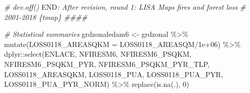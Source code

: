 \documentclass[10pt,landscape,a3paper]{article}
\newenvironment{Shaded}{\begin{snugshade}}{\end{snugshade}}
\newcommand{\AttributeTok}[1]{\textcolor[rgb]{0.77,0.63,0.00}{#1}}
\newcommand{\CommentTok}[1]{\textcolor[rgb]{0.56,0.35,0.01}{\textit{#1}}}
\newcommand{\DecValTok}[1]{\textcolor[rgb]{0.00,0.00,0.81}{#1}}
\newcommand{\FloatTok}[1]{\textcolor[rgb]{0.00,0.00,0.81}{#1}}
\newcommand{\FunctionTok}[1]{\textcolor[rgb]{0.00,0.00,0.00}{#1}}
\newcommand{\NormalTok}[1]{#1}
\newcommand{\OtherTok}[1]{\textcolor[rgb]{0.56,0.35,0.01}{#1}}
\newcommand{\RegionMarkerTok}[1]{#1}
\newcommand{\SpecialCharTok}[1]{\textcolor[rgb]{0.00,0.00,0.00}{#1}}
\begin{document}
\begin{Shaded}
\begin{Highlighting}[]
\CommentTok{\# dev.off() }\RegionMarkerTok{END}\CommentTok{: After revision, round 1: LISA Maps fires and forest loss}
\CommentTok{\# 2001{-}2018 \{tmap\} \#\#\#\#}

\CommentTok{\# Statistical summaries}
\NormalTok{grdzonaledam6 }\OtherTok{\textless{}{-}}\NormalTok{ grdzonal }\SpecialCharTok{\%\textgreater{}\%}
    \FunctionTok{mutate}\NormalTok{(}\AttributeTok{LOSS0118\_AREASQKM =}\NormalTok{ LOSS0118\_AREASQM}\SpecialCharTok{/}\FloatTok{1e+06}\NormalTok{) }\SpecialCharTok{\%\textgreater{}\%}
\NormalTok{    dplyr}\SpecialCharTok{::}\FunctionTok{select}\NormalTok{(ENLACE, NFIRESM6, NFIRESM6\_PSQKM, NFIRESM6\_PSQKM\_PYR, NFIRESM6\_PSQKM\_PYR\_TLP,}
\NormalTok{        LOSS0118\_AREASQKM, LOSS0118\_PUA, LOSS0118\_PUA\_PYR, LOSS0118\_PUA\_PYR\_NORM) }\SpecialCharTok{\%\textgreater{}\%}
    \FunctionTok{replace}\NormalTok{(}\FunctionTok{is.na}\NormalTok{(.), }\DecValTok{0}\NormalTok{)}


\end{Highlighting}
\end{Shaded}
\end{document}
